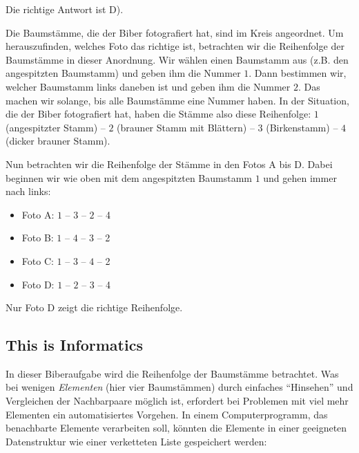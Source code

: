 \documentclass[a4paper,11pt]{report}
\newcommand{\taskGraphicsFolder}{..}
\begin{document}
Die richtige Antwort ist D). \raisebox{-0.5ex}{}

Die Baumstämme, die der Biber fotografiert hat, sind im Kreis angeordnet. Um herauszufinden, welches Foto das richtige ist, betrachten wir die Reihenfolge der Baumstämme in dieser Anordnung. Wir wählen einen Baumstamm aus (z.B. den angespitzten Baumstamm) und geben ihm die Nummer $1$. Dann bestimmen wir, welcher Baumstamm links daneben ist und geben ihm die Nummer $2$. Das machen wir solange, bis alle Baumstämme eine Nummer haben. In der Situation, die der Biber fotografiert hat, haben die Stämme also diese Reihenfolge: $1$ (angespitzter Stamm) – $2$ (brauner Stamm mit Blättern) – $3$ (Birkenstamm) – $4$ (dicker brauner Stamm).

{\centering%
\par}

Nun betrachten wir die Reihenfolge der Stämme in den Fotos A bis D. Dabei beginnen wir wie oben mit dem angespitzten Baumstamm $1$ und gehen immer nach links:

\begin{itemize}
  \item Foto A: $1$ – $3$ – $2$ – 4
  \item Foto B: $1$ – $4$ – $3$ – 2
  \item Foto C: $1$ – $3$ – $4$ – 2
  \item Foto D: $1$ – $2$ – $3$ – 4
\end{itemize}

Nur Foto D zeigt die richtige Reihenfolge.

{\centering%
\par}


\subsection*{This is Informatics}

In dieser Biberaufgabe wird die Reihenfolge der Baumstämme betrachtet. Was bei wenigen \emph{Elementen} (hier vier Baumstämmen) durch einfaches “Hinsehen” und Vergleichen der Nachbarpaare möglich ist, erfordert bei Problemen mit viel mehr Elementen ein automatisiertes Vorgehen. In einem Computerprogramm, das benachbarte Elemente verarbeiten soll, könnten die Elemente in einer geeigneten Datenstruktur wie einer verketteten Liste gespeichert werden:
\end{document}
